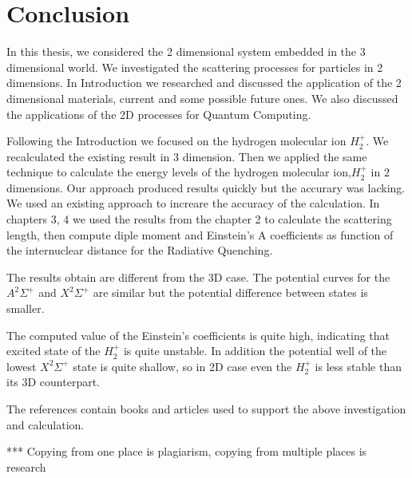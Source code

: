 \chapter{Conclusion}
\label{conclusion}

In this thesis, we considered the 2 dimensional system embedded in the 3 dimensional world. We investigated the scattering processes for particles in 2 dimensions. In Introduction we researched and discussed the application of the 2 dimensional materials, current and some possible future ones. We also discussed the applications of the 2D processes for Quantum Computing.

Following the Introduction we focused on the hydrogen molecular ion $ H_2^{+} $. We recalculated the existing result in 3 dimension. 
Then we applied the same technique to calculate the energy levels of the hydrogen molecular ion,$ H_2^{+} $ in 2 dimensions. Our approach produced results quickly but the accurary was lacking. We used an existing approach to increare the accuracy of the calculation. In chapters 3, 4 we used the results from the chapter 2 to calculate the scattering length, then compute diple moment and Einstein's A coefficients as function of the internuclear distance for the Radiative Quenching.

The results obtain are different from the 3D case. The potential curves for the $ A^2\Sigma^+ $ and $X^2\Sigma^+ $ are similar but the potential difference between states is smaller. 

The computed value of the Einstein's coefficients is quite high, indicating that excited state of the $ H_2^{+} $ is quite unstable. In addition the potential well of the lowest $ X^2\Sigma^+ $ state is quite shallow, so in 2D case even the  $ H_2^{+} $ is less stable than its 3D counterpart.  

The references contain books and articles used to support the above investigation and calculation.

*** Copying from one place is plagiarism, copying from multiple places is research



